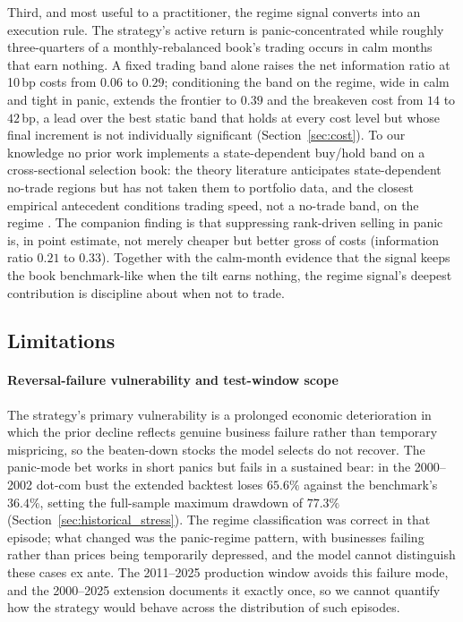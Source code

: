 Third, and most useful to a practitioner, the regime signal converts into an execution rule. The strategy's active return is panic-concentrated while roughly three-quarters of a monthly-rebalanced book's trading occurs in calm months that earn nothing. A fixed trading band alone raises the net information ratio at 10\,bp costs from $0.06$ to $0.29$; conditioning the band on the regime, wide in calm and tight in panic, extends the frontier to $0.39$ and the breakeven cost from $14$ to $42$\,bp, a lead over the best static band that holds at every cost level but whose final increment is not individually significant (Section~\ref{sec:cost}). To our knowledge no prior work implements a state-dependent buy/hold band on a cross-sectional selection book: the theory literature anticipates state-dependent no-trade regions \citep{Jang2007, LynchTan2011} but has not taken them to portfolio data, and the closest empirical antecedent conditions trading speed, not a no-trade band, on the regime \citep{CollinDufresne2020}.
The companion finding is that suppressing rank-driven selling in panic is, in point estimate, not merely cheaper but better gross of costs (information ratio $0.21$ to $0.33$). Together with the calm-month evidence that the signal keeps the book benchmark-like when the tilt earns nothing, the regime signal's deepest contribution is discipline about when not to trade.

\subsection{Limitations}\label{sec:limitations}

\paragraph{Reversal-failure vulnerability and test-window scope}
The strategy's primary vulnerability is a prolonged economic deterioration in which the prior decline reflects genuine business failure rather than temporary mispricing, so the beaten-down stocks the model selects do not recover. The panic-mode bet works in short panics but fails in a sustained bear: in the 2000--2002 dot-com bust the extended backtest loses $65.6\%$ against the benchmark's $36.4\%$, setting the full-sample maximum drawdown of $77.3\%$ (Section~\ref{sec:historical_stress}). The regime classification was correct in that episode; what changed was the panic-regime pattern, with businesses failing rather than prices being temporarily depressed, and the model cannot distinguish these cases ex ante. The 2011--2025 production window avoids this failure mode, and the 2000--2025 extension documents it exactly once, so we cannot quantify how the strategy would behave across the distribution of such episodes.

